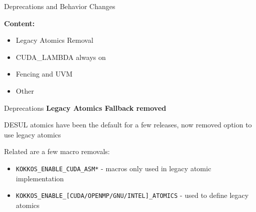 

\begin{frame}[fragile]

  {\Huge Deprecations and Behavior Changes}

  \vspace{10pt}

  \textbf{Content:}
  \begin{itemize}
    \item Legacy Atomics Removal
    \item CUDA\_LAMBDA always on
    \item Fencing and UVM
    \item Other
  \end{itemize}

\end{frame}

\begin{frame}[fragile]{Deprecations}
\textbf{Legacy Atomics Fallback removed}

DESUL atomics have been the default for a few releases, now removed option to use legacy atomics

Related are a few macro removals:
\begin{itemize}
  \item \texttt{KOKKOS\_ENABLE\_CUDA\_ASM*} - macros only used in legacy atomic implementation
  \item \texttt{KOKKOS\_ENABLE\_[CUDA/OPENMP/GNU/INTEL]\_ATOMICS} - used to define legacy atomics
\end{itemize}
\end{frame}

